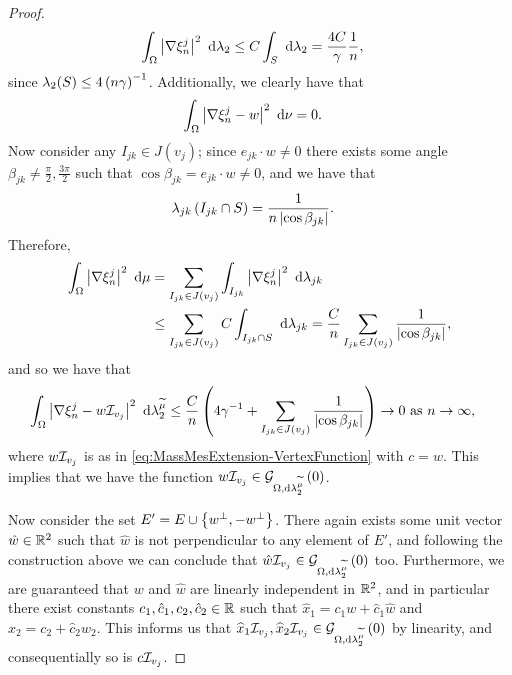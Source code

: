 \begin{proof}
	\begin{align*}
		\int_{\Omega}\left\lvert \nabla\xi_n^j \right\rvert^2 \ \mathrm{d}\lambda_2
		&\leq C\int_{S} \ \mathrm{d}\lambda_2 = \frac{4C}{\gamma}\frac{1}{n},
	\end{align*}
	since $\lambda_2(S)\leq 4\left( n\gamma \right)^{-1}$.
	Additionally, we clearly have that
	\begin{align*}
		\int_{\Omega}\left\lvert \nabla\xi_n^j - w \right\rvert^2 \ \mathrm{d}\nu &= 0.
	\end{align*}
	Now consider any $I_{jk}\in J(v_j)$; since $e_{jk}\cdot w\neq 0$ there exists some angle $\beta_{jk}\neq\frac{\pi}{2},\frac{3\pi}{2}$ such that $\cos\beta_{jk}=e_{jk}\cdot w\neq 0$, and we have that
	\begin{align*}
		\lambda_{jk}\left( I_{jk}\cap S \right) &= \frac{1}{n\left\lvert \cos\beta_{jk} \right\rvert}.
	\end{align*}
	Therefore,
	\begin{align*}
		\int_{\Omega}\left\lvert \nabla\xi_n^j \right\rvert^2 \ \mathrm{d}\mu
		&= \sum_{I_{jk}\in J(v_j)} \int_{I_{jk}}\left\lvert \nabla\xi_n^j \right\rvert^2 \ \mathrm{d}\lambda_{jk} \\
		&\leq \sum_{I_{jk}\in J(v_j)} C\int_{I_{jk}\cap S} \ \mathrm{d}\lambda_{jk}
		= \frac{C}{n} \sum_{I_{jk}\in J(v_j)} \frac{1}{\left\lvert \cos\beta_{jk} \right\rvert},
	\end{align*}
	and so we have that
	\begin{align*}
		\int_{\Omega}\left\lvert \nabla\xi_n^j - w\mathcal{I}_{v_j} \right\rvert^2 \ \mathrm{d}\lambda_2^{\widetilde{\mu}}
		&\leq \frac{C}{n}\left(  4\gamma^{-1} + \sum_{I_{jk}\in J(v_j)} \frac{1}{\left\lvert \cos\beta_{jk} \right\rvert}  \right)
		\rightarrow0 \ \text{as} \ n \rightarrow\infty,
	\end{align*}
	where $w\mathcal{I}_{v_j}$ is as in \eqref{eq:MassMesExtension-VertexFunction} with $c=w$.
	This implies that we have the function $w\mathcal{I}_{v_j}\in\mathcal{G}_{ \Omega, \mathrm{d}\lambda_2^{\widetilde{\mu}}}\left( 0 \right)$.
	
	Now consider the set $E' = E \cup \left\{ w^{\perp}, -w^{\perp} \right\}$.
	There again exists some unit vector $\hat{w}\in\mathbb{R}^2$ such that $\hat{w}$ is not perpendicular to any element of $E'$, and following the construction above we can conclude that $\hat{w}\mathcal{I}_{v_j}\in\mathcal{G}_{ \Omega, \mathrm{d}\lambda_2^{\widetilde{\mu}}}\left( 0 \right)$ too.
	Furthermore, we are guaranteed that $w$ and $\hat{w}$ are linearly independent in $\mathbb{R}^2$, and in particular there exist constants $c_1,\hat{c}_1,c_2,\hat{c}_2\in\mathbb{R}$ such that $\widehat{x}_1 = c_1 w + \hat{c}_1\hat{w}$ and $\widehat{x}_2 = c_2 + \hat{c}_2\hat{w}_2$.
	This informs us that $\widehat{x}_1\mathcal{I}_{v_j}, \widehat{x}_2\mathcal{I}_{v_j}\in\mathcal{G}_{ \Omega, \mathrm{d}\lambda_2^{\widetilde{\mu}}}\left( 0 \right)$ by linearity, and consequentially so is $c\mathcal{I}_{v_j}$.
\end{proof}

